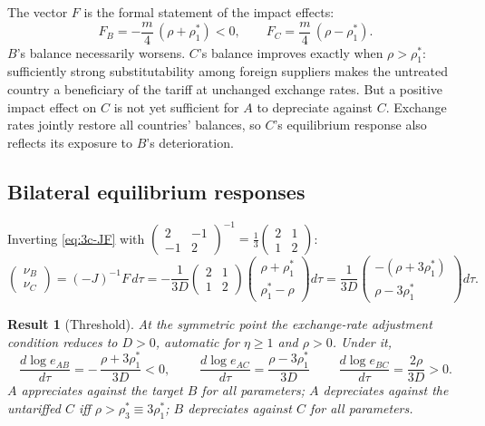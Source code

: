 \documentclass[11pt]{article}
\newtheorem{result}{Result}[section]
\begin{document}
The vector $F$ is the formal statement of the impact effects:
\begin{equation}
F_B = -\frac{m}{4}\,(\rho + \rho_1^*) < 0,
\qquad
F_C = \frac{m}{4}\,(\rho - \rho_1^*) .
\label{eq:3c-F}
\end{equation}
$B$'s balance necessarily worsens. $C$'s balance improves exactly when $\rho > \rho_1^*$: sufficiently strong substitutability among foreign suppliers makes the untreated country a beneficiary of the tariff at unchanged exchange rates. But a positive impact effect on $C$ is not yet sufficient for $A$ to depreciate against $C$. Exchange rates jointly restore all countries' balances, so $C$'s equilibrium response also reflects its exposure to $B$'s deterioration.

\subsection{Bilateral equilibrium responses}

Inverting \eqref{eq:3c-JF} with $\left(\begin{smallmatrix} 2 & -1 \\ -1 & 2\end{smallmatrix}\right)^{-1} = \tfrac{1}{3}\left(\begin{smallmatrix} 2 & 1 \\ 1 & 2 \end{smallmatrix}\right)$:
\begin{equation}
\begin{pmatrix} \nu_B \\ \nu_C \end{pmatrix}
= (-J)^{-1} F\, d\tau
= -\frac{1}{3D}
\begin{pmatrix} 2 & 1 \\ 1 & 2 \end{pmatrix}
\begin{pmatrix} \rho + \rho_1^* \\ \rho_1^* - \rho \end{pmatrix} d\tau
= \frac{1}{3D}
\begin{pmatrix} -(\rho + 3\rho_1^*) \\ \rho - 3\rho_1^* \end{pmatrix} d\tau .
\label{eq:3c-solution}
\end{equation}

\begin{result}[Threshold]
At the symmetric point the exchange-rate adjustment condition reduces to $D > 0$, automatic for $\eta \geq 1$ and $\rho > 0$. Under it,
\begin{equation}
\frac{d\log e_{AB}}{d\tau} = -\,\frac{\rho + 3\rho_1^*}{3D} < 0,
\qquad
\boxed{\;\frac{d\log e_{AC}}{d\tau} = \frac{\rho - 3\rho_1^*}{3D}\;}
\qquad
\frac{d\log e_{BC}}{d\tau} = \frac{2\rho}{3D} > 0 .
\label{eq:3c-slopes}
\end{equation}
$A$ appreciates against the target $B$ for all parameters; $A$ depreciates against the untariffed $C$ iff $\rho > \rho_3^* \equiv 3\rho_1^*$; $B$ depreciates against $C$ for all parameters.
\end{result}
\end{document}
